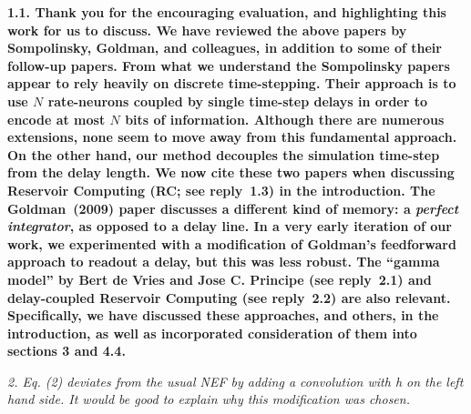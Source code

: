 \documentclass[a4paper]{article}
\newcommand{\newl}{\par\null\par}
\newcommand{\REVIEW}[1]{{\it #1}}
\newcommand{\REPLY}[1]{\newl\begin{adjustwidth}{2em}{2em}{\bf #1}\end{adjustwidth}\newl}
\begin{document}
\REPLY{1.1. Thank you for the encouraging evaluation, and highlighting this work for us to discuss.
We have reviewed the above papers by Sompolinsky, Goldman, and colleagues, in addition to some of their follow-up papers.
From what we understand the Sompolinsky papers appear to rely heavily on discrete time-stepping.
Their approach is to use $N$ rate-neurons coupled by single time-step delays in order to encode at most $N$ bits of information.
Although there are numerous extensions, none seem to move away from this fundamental approach.
On the other hand, our method decouples the simulation time-step from the delay length.
We now cite these two papers when discussing Reservoir Computing (RC; see reply~1.3) in the introduction.
The Goldman~(2009) paper discusses a different kind of memory: a \textit{perfect integrator}, as opposed to a delay line.
In a very early iteration of our work, we experimented with a modification of Goldman's feedforward approach to readout a delay, but this was less robust.
The ``gamma model'' by Bert de Vries and Jose C. Principe (see reply~2.1) and delay-coupled Reservoir Computing (see reply~2.2) are also relevant.
Specifically, we have discussed these approaches, and others, in the introduction, as well as incorporated consideration of them into sections 3 and 4.4.}

\REVIEW{2. Eq. (2) deviates from the usual NEF by adding a convolution with h on the left hand side. It would be good to explain why this modification was chosen.}
\end{document}
